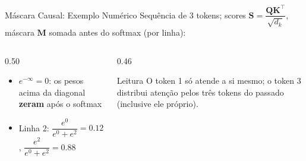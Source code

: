 \documentclass[aspectratio=169, xcolor=dvipsnames]{beamer}
\begin{document}
  \begin{frame}{Máscara Causal: Exemplo Numérico}
    Sequência de 3 tokens; scores $\mathbf{S} = \dfrac{\mathbf{Q}\mathbf{K}^\top}{\sqrt{d_k}}$, máscara $\mathbf{M}$ somada antes do softmax (por linha):
    \vspace{0.4em}
    \begin{center}
    \end{center}
    \vspace{0.5em}
    \begin{columns}[T]
      \begin{column}{0.50\textwidth}
        \begin{itemize}
          \item $e^{-\infty} = 0$: os pesos acima da diagonal \textbf{zeram} após o softmax
          \item Linha 2: $\dfrac{e^{0}}{e^{0}+e^{2}} = 0.12$, \quad $\dfrac{e^{2}}{e^{0}+e^{2}} = 0.88$
        \end{itemize}
      \end{column}
      \begin{column}{0.46\textwidth}
        \begin{exampleblock}{Leitura}
          O token 1 só atende a si mesmo; o token 3 distribui atenção pelos três tokens do passado (inclusive ele próprio).
        \end{exampleblock}
      \end{column}
    \end{columns}
  \end{frame}
\end{document}
